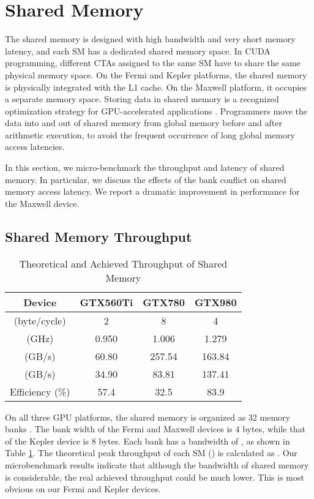 \documentclass[10pt,journal,compsoc]{IEEEtran}
\theoremstyle{definition}
\begin{document}
\section{Shared Memory}
The shared memory is designed with high bandwidth and very short memory latency, and each SM has a dedicated shared memory space. In CUDA programming, different CTAs assigned to the same SM have to share the same physical memory space. On the Fermi and Kepler platforms, the shared memory is physically integrated with the L1 cache. On the Maxwell platform, it occupies a separate memory space. Storing data in shared memory is a recognized optimization strategy for GPU-accelerated applications \cite{li2014accelerating,matrixmul_SDK,zhao2014g}. Programmers move the data into and out of shared memory from global memory before and after arithmetic execution, to avoid the frequent occurrence of long global memory access latencies.

In this section, we micro-benchmark the throughput and latency of shared memory. In particular, we discuss the effects of the bank conflict on shared memory access latency. We report a dramatic improvement in performance for the Maxwell device.

\subsection{Shared Memory Throughput}

\begin{table}

\renewcommand{\arraystretch}{1.2}
\centering
\caption{Theoretical and Achieved Throughput of Shared Memory}
    \begin{tabular}{|c|c|c|c|}
            \hline
            Device & GTX560Ti & GTX780 & GTX980 \\ \hline
             (byte/cycle) & 2 & 8 & 4 \\ \hline
             (GHz) & 0.950 & 1.006 & 1.279 \\ \hline
             (GB/s) & 60.80 & 257.54 & 163.84 \\ \hline
             (GB/s) & 34.90 & 83.81 & 137.41 \\ \hline
            Efficiency (\%) & 57.4 & 32.5 & 83.9 \\ \hline
    \end{tabular}
\label{tab:sharedThroughputParameters}
\end{table}

On all three GPU platforms, the shared memory is organized as 32 memory banks \cite{cudacprogrammingguide}. The bank width of the Fermi and Maxwell devices is 4 bytes, while that of the Kepler device is 8 bytes. Each bank has a bandwidth of , as shown in Table \ref{tab:sharedThroughputParameters}. The theoretical peak throughput of each SM () is calculated as . Our microbenchmark results indicate that although the bandwidth of shared memory is considerable, the real achieved throughput could be much lower. This is most obvious on our Fermi and Kepler devices.
\end{document}
